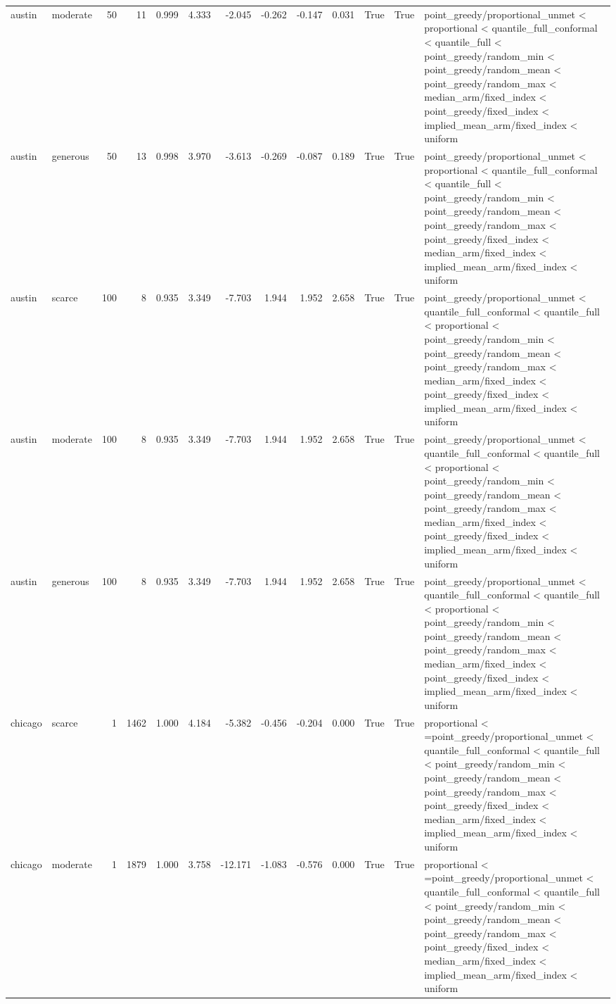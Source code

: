 \begin{tabular}{llrrrrrrrrrrl}
austin & moderate & 50 & 11 & 0.999 & 4.333 & -2.045 & -0.262 & -0.147 & 0.031 & True & True & point\_greedy/proportional\_unmet < proportional < quantile\_full\_conformal < quantile\_full < point\_greedy/random\_min < point\_greedy/random\_mean < point\_greedy/random\_max < median\_arm/fixed\_index < point\_greedy/fixed\_index < implied\_mean\_arm/fixed\_index < uniform \\
austin & generous & 50 & 13 & 0.998 & 3.970 & -3.613 & -0.269 & -0.087 & 0.189 & True & True & point\_greedy/proportional\_unmet < proportional < quantile\_full\_conformal < quantile\_full < point\_greedy/random\_min < point\_greedy/random\_mean < point\_greedy/random\_max < point\_greedy/fixed\_index < median\_arm/fixed\_index < implied\_mean\_arm/fixed\_index < uniform \\
austin & scarce & 100 & 8 & 0.935 & 3.349 & -7.703 & 1.944 & 1.952 & 2.658 & True & True & point\_greedy/proportional\_unmet < quantile\_full\_conformal < quantile\_full < proportional < point\_greedy/random\_min < point\_greedy/random\_mean < point\_greedy/random\_max < median\_arm/fixed\_index < point\_greedy/fixed\_index < implied\_mean\_arm/fixed\_index < uniform \\
austin & moderate & 100 & 8 & 0.935 & 3.349 & -7.703 & 1.944 & 1.952 & 2.658 & True & True & point\_greedy/proportional\_unmet < quantile\_full\_conformal < quantile\_full < proportional < point\_greedy/random\_min < point\_greedy/random\_mean < point\_greedy/random\_max < median\_arm/fixed\_index < point\_greedy/fixed\_index < implied\_mean\_arm/fixed\_index < uniform \\
austin & generous & 100 & 8 & 0.935 & 3.349 & -7.703 & 1.944 & 1.952 & 2.658 & True & True & point\_greedy/proportional\_unmet < quantile\_full\_conformal < quantile\_full < proportional < point\_greedy/random\_min < point\_greedy/random\_mean < point\_greedy/random\_max < median\_arm/fixed\_index < point\_greedy/fixed\_index < implied\_mean\_arm/fixed\_index < uniform \\
chicago & scarce & 1 & 1462 & 1.000 & 4.184 & -5.382 & -0.456 & -0.204 & 0.000 & True & True & proportional < =point\_greedy/proportional\_unmet < quantile\_full\_conformal < quantile\_full < point\_greedy/random\_min < point\_greedy/random\_mean < point\_greedy/random\_max < point\_greedy/fixed\_index < median\_arm/fixed\_index < implied\_mean\_arm/fixed\_index < uniform \\
chicago & moderate & 1 & 1879 & 1.000 & 3.758 & -12.171 & -1.083 & -0.576 & 0.000 & True & True & proportional < =point\_greedy/proportional\_unmet < quantile\_full\_conformal < quantile\_full < point\_greedy/random\_min < point\_greedy/random\_mean < point\_greedy/random\_max < point\_greedy/fixed\_index < median\_arm/fixed\_index < implied\_mean\_arm/fixed\_index < uniform \\

\end{tabular}
